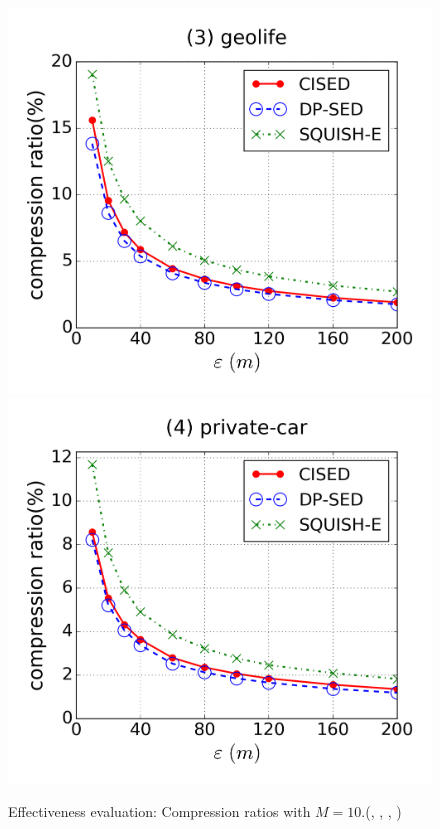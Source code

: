\begin{figure}[tb!]
\includegraphics[scale = 0.250]{figures/Exp-cr-epsilon-geolife.png}
\includegraphics[scale = 0.250]{figures/Exp-cr-epsilon-private.png}
\vspace{-3ex}
\caption{\small Effectiveness evaluation: Compression ratios with $M=10$.(\cist, \cista, \dpa, \squishe)}
\label{fig:cr-m10}
\vspace{-1.0ex}
\end{figure}

